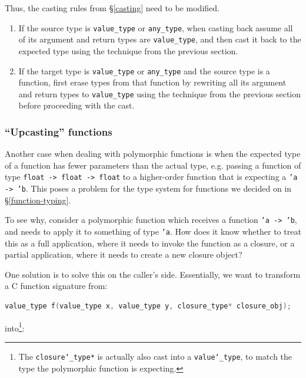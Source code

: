 \documentclass[12pt,a4paper,twoside,openright]{report}
\begin{document}
Thus, the casting rules from \S\ref{casting} need to be modified.

\begin{enumerate}

\item If the source type is \verb|value_type| or \verb|any_type|, when casting
    back assume all of its argument and return types are \verb|value_type|, and
    then cast it back to the expected type using the technique from the previous
    section.

\item If the target type is \verb|value_type| or \verb|any_type| and the source
    type is a function, first erase types from that function by rewriting all
    its argument and return types to \verb|value_type| using the technique from
    the previous section before proceeding with the cast.

\end{enumerate}

\subsubsection{``Upcasting'' functions}

Another case when dealing with polymorphic functions is when the expected type
of a function has fewer parameters than the actual type, e.g.  passing a
function of type \texttt{float -> float -> float} to a higher-order function
that is expecting a \texttt{'a -> 'b}. This poses a problem for the type system
for functions we decided on in \S\ref{function-typing}.

To see why, consider a polymorphic function which receives a function 
\texttt{'a -> 'b}, and needs to apply it to something of type \texttt{'a}. How 
does it know whether to treat this as a full application, where it needs to 
invoke the function as a closure, or a partial application, where it needs to 
create a new closure object?

One solution is to solve this on the caller's side. Essentially, we want to
transform a C function signature from:

\begin{lstlisting}[language=C]
value_type f(value_type x, value_type y, closure_type* closure_obj);
\end{lstlisting}

into\footnote{The \texttt{closure\char`_type*} is actually also cast into a 
\texttt{value\char`_type}, to match the type the polymorphic function is 
expecting.}:
\end{document}
